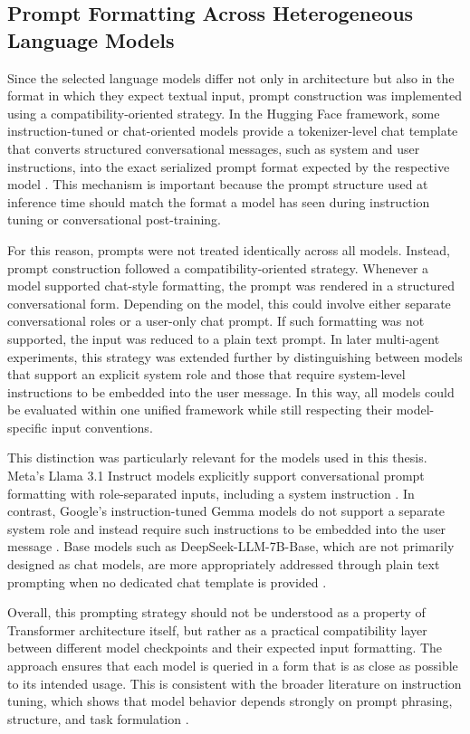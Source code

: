 \subsection{Prompt Formatting Across Heterogeneous Language Models}

Since the selected language models differ not only in architecture but also in the format in which they expect textual input, prompt construction was implemented using a compatibility-oriented strategy. In the Hugging Face framework, some instruction-tuned or chat-oriented models provide a tokenizer-level chat template that converts structured conversational messages, such as system and user instructions, into the exact serialized prompt format expected by the respective model \cite{hf_chat_templates,hf_chat_templates_writing}. This mechanism is important because the prompt structure used at inference time should match the format a model has seen during instruction tuning or conversational post-training.

For this reason, prompts were not treated identically across all models. Instead, prompt construction followed a compatibility-oriented strategy. Whenever a model supported chat-style formatting, the prompt was rendered in a structured conversational form. Depending on the model, this could involve either separate conversational roles or a user-only chat prompt. If such formatting was not supported, the input was reduced to a plain text prompt. In later multi-agent experiments, this strategy was extended further by distinguishing between models that support an explicit system role and those that require system-level instructions to be embedded into the user message. In this way, all models could be evaluated within one unified framework while still respecting their model-specific input conventions.

This distinction was particularly relevant for the models used in this thesis. Meta's Llama 3.1 Instruct models explicitly support conversational prompt formatting with role-separated inputs, including a system instruction \cite{meta_llama_prompt}. In contrast, Google's instruction-tuned Gemma models do not support a separate system role and instead require such instructions to be embedded into the user message \cite{gemma_prompt_structure}. Base models such as DeepSeek-LLM-7B-Base, which are not primarily designed as chat models, are more appropriately addressed through plain text prompting when no dedicated chat template is provided \cite{deepseek_model_card}.

Overall, this prompting strategy should not be understood as a property of Transformer architecture itself, but rather as a practical compatibility layer between different model checkpoints and their expected input formatting. The approach ensures that each model is queried in a form that is as close as possible to its intended usage. This is consistent with the broader literature on instruction tuning, which shows that model behavior depends strongly on prompt phrasing, structure, and task formulation \cite{ouyang2022traininglanguagemodelsfollow,sanh2022multitaskpromptedtrainingenables,chung2022scalinginstructionfinetunedlanguagemodels}.

